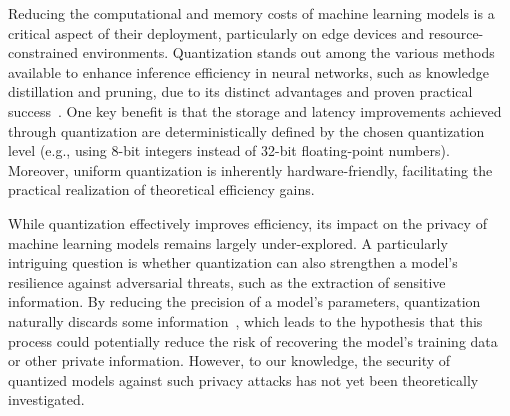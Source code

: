

Reducing the computational and memory costs of machine learning models is a critical aspect of their deployment, particularly on edge devices and resource-constrained environments. Quantization stands out among the various methods available to enhance inference efficiency in neural networks, such as knowledge distillation and pruning, due to its distinct advantages and proven practical success~\cite{gholami2022survey}. One key benefit is that the storage and latency improvements achieved through quantization are deterministically defined by the chosen quantization level (e.g., using 8-bit integers instead of 32-bit floating-point numbers). Moreover, uniform quantization is inherently hardware-friendly, facilitating the practical realization of theoretical efficiency gains.


While quantization effectively improves efficiency, its impact on the privacy of machine learning models remains largely under-explored. A particularly intriguing question is whether quantization can also strengthen a model's resilience against adversarial threats, such as the extraction of sensitive information. By reducing the precision of a model’s parameters, quantization naturally discards some information~\cite{6451278}, which leads to the hypothesis that this process could potentially reduce the risk of recovering the model’s training data or other private information. However, to our knowledge, the security of quantized models against such privacy attacks has not yet been theoretically investigated.



